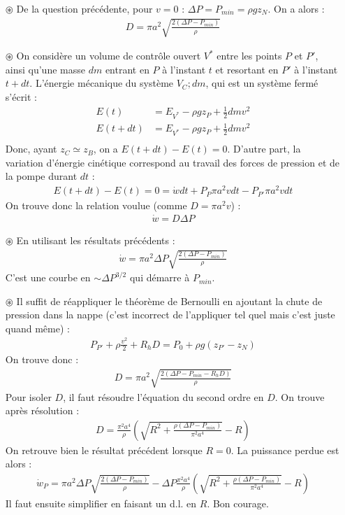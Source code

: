 \documentclass{report}
\begin{document}
\begin{itemize}
	\item[$\circledast$] De la question précédente, pour $v=0$ : $\Delta P =P_{min} = \rho g z_N$. On a alors :
	\begin{align*}
		D=\pi a^2 \sqrt{\frac{2(\Delta P-P_{min})}{\rho}}
	\end{align*}
	
	\item[$\circledast$] On considère un volume de contrôle ouvert $V^\ast$ entre les points $P$ et $P'$, ainsi qu'une masse $dm$ entrant en $P$ à l'instant $t$ et resortant en $P'$ à l'instant $t+dt$. L'énergie mécanique du système ${V_C; dm}$, qui est un système fermé s'écrit :
	\begin{align*}
		E(t)&=E_{V^\ast}-\rho g z_P + \frac{1}{2}dm v^2 \\
		E(t+dt)&=E_{V^\ast}-\rho g z_P + \frac{1}{2}dm v^2 \\
	\end{align*}
	Donc, ayant $z_C\simeq z_B$, on a $E(t+dt)-E(t)=0$. D'autre part, la variation d'énergie cinétique correspond au travail des forces de pression et de la pompe durant $dt$ :
	\begin{align*}
	E(t+dt)-E(t)=0=\dot{w}dt+P_{P} \pi a^2 v dt -P_{P'}\pi a^2 v dt
	\end{align*}
	On trouve donc la relation voulue (comme $D=\pi a^2 v$) :
	\begin{align*}
		\dot{w} = D\Delta P 
	\end{align*}
	
	\item[$\circledast$] En utilisant les résultats précédents :
	\begin{align*}
		\dot{w}= \pi a^2 \Delta P \sqrt{\frac{2(\Delta P-P_{min})}{\rho}}
	\end{align*}
	 C'est une courbe en $\sim\Delta P^{3/2}$ qui démarre à $P_{min}$.
	
	\item[$\circledast$] Il suffit de réappliquer le théorème de Bernoulli en ajoutant la chute de pression dans la nappe (c'est incorrect de l'appliquer tel quel mais c'est juste quand même) :
	\begin{align*}
		P_{P'}+\rho\frac{v^2}{2}+R_hD=P_0+\rho g (z_{P'}-z_N)
	\end{align*}
	On trouve donc :
	\begin{align*}
		D=\pi a^2 \sqrt{\frac{2(\Delta P-P_{min}-R_hD)}{\rho}}
	\end{align*}
	Pour isoler $D$, il faut résoudre l'équation du second ordre en $D$. On trouve après résolution :
	\begin{align*}
		D=\frac{\pi^2 a^4}{\rho}\left( \sqrt{R^2+\frac{\rho(\Delta P-P_{min})}{\pi^2 a^4}}-R\right) 
	\end{align*}
On retrouve bien le résultat précédent lorsque $R=0$. La puissance perdue est alors :
\begin{align*}
	\dot{w}_P=\pi a^2 \Delta P \sqrt{\frac{2(\Delta P-P_{min})}{\rho}}-\Delta
	 P\frac{\pi^2 a^4}{\rho}\left( \sqrt{R^2+\frac{\rho(\Delta P-P_{min})}{\pi^2 a^4}}-R\right) 
\end{align*}
Il faut ensuite simplifier en faisant un d.l. en $R$. Bon courage.


\end{itemize}
\end{document}
